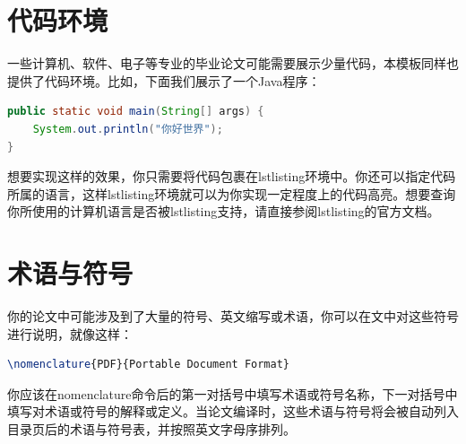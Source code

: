 \section{代码环境}

一些计算机、软件、电子等专业的毕业论文可能需要展示少量代码，本模板同样也提供了代码环境。比如，下面我们展示了一个Java程序：

\begin{tcolorbox}
\begin{lstlisting}[language=Java]
public static void main(String[] args) {
    System.out.println("你好世界");
}
\end{lstlisting}
\end{tcolorbox}

想要实现这样的效果，你只需要将代码包裹在{\codefont lstlisting}环境中。你还可以指定代码所属的语言，这样{\codefont lstlisting}环境就可以为你实现一定程度上的代码高亮。想要查询你所使用的计算机语言是否被{\codefont lstlisting}支持，请直接参阅{\codefont lstlisting}的官方文档。

\section{术语与符号}

你的论文中可能涉及到了大量的符号、英文缩写或术语，你可以在文中对这些符号进行说明，就像这样：

\begin{tcolorbox}
\begin{lstlisting}[language=TeX]
\nomenclature{PDF}{Portable Document Format}
\end{lstlisting}
\end{tcolorbox}

\noindent 你应该在{\codefont nomenclature}命令后的第一对括号中填写术语或符号名称，下一对括号中填写对术语或符号的解释或定义。当论文编译时，这些术语与符号将会被自动列入目录页后的术语与符号表，并按照英文字母序排列。